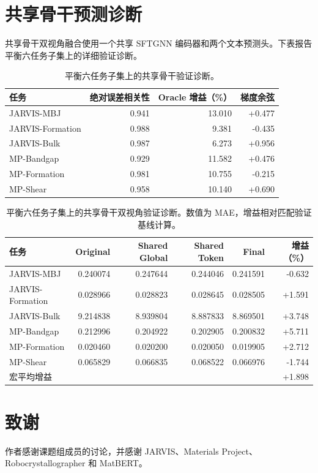 \documentclass[a4paper,fleqn]{cas-sc}
\begin{document}
\section{共享骨干预测诊断}\label{app:shared}
共享骨干双视角融合使用一个共享 SFTGNN 编码器和两个文本预测头。下表报告平衡六任务子集上的详细验证诊断。
\begin{table}[!htbp]\caption{平衡六任务子集上的共享骨干验证诊断。}\label{tab:sbdvf_detail}\centering\scriptsize
\begin{tabular}{lrrr}\toprule 任务&绝对误差相关性&Oracle 增益（\%）&梯度余弦\\\midrule
JARVIS-MBJ&0.941&13.010&+0.477\\JARVIS-Formation&0.988&9.381&-0.435\\JARVIS-Bulk&0.987&6.273&+0.956\\MP-Bandgap&0.929&11.582&+0.476\\MP-Formation&0.981&10.755&-0.215\\MP-Shear&0.958&10.140&+0.690\\\bottomrule\end{tabular}\end{table}
\begin{table}[!htbp]\caption{平衡六任务子集上的共享骨干双视角验证诊断。数值为 MAE，增益相对匹配验证基线计算。}\label{tab:sbdvf_compact}\centering\scriptsize
\begin{tabular}{lrrrrr}\toprule 任务&Original&Shared Global&Shared Token&Final&增益（\%）\\\midrule
JARVIS-MBJ&0.240074&0.247644&0.244046&0.241591&-0.632\\JARVIS-Formation&0.028966&0.028823&0.028645&0.028505&+1.591\\JARVIS-Bulk&9.214838&8.939804&8.887833&8.869501&+3.748\\MP-Bandgap&0.212996&0.204922&0.202905&0.200832&+5.711\\MP-Formation&0.020460&0.020200&0.020050&0.019905&+2.712\\MP-Shear&0.065829&0.066835&0.068522&0.066976&-1.744\\\midrule
宏平均增益&&&&&+1.898\\\bottomrule\end{tabular}\end{table}

\FloatBarrier
\section*{致谢}
作者感谢课题组成员的讨论，并感谢 JARVIS、Materials Project、Robocrystallographer 和 MatBERT。
\end{document}
